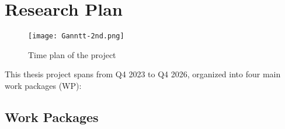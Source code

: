 \documentclass[11pt]{article}
\begin{document}
\section{Research Plan}

    \begin{figure}[H]
        \centering
        \texttt{[image: Ganntt-2nd.png]}
        \caption{Time plan of the project}
        \label{fig:Gantt}
    \end{figure}


This thesis project spans from Q4 2023 to Q4 2026, organized into four main work packages (WP):

\subsection{Work Packages}
\end{document}
